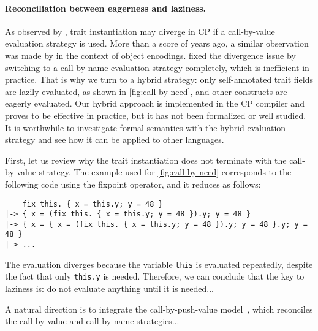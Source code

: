 \paragraph{Reconciliation between eagerness and laziness.}
As observed by \citet{fan2022direct}, trait instantiation may diverge in CP if a
call-by-value evaluation strategy is used. More than a score of years ago, a
similar observation was made by \citet{bruce1999comparing} in the context of
object encodings. \citeauthor{fan2022direct} fixed the divergence issue by
switching to a call-by-name evaluation strategy completely, which is inefficient
in practice. That is why we turn to a hybrid strategy: only self-annotated trait
fields are lazily evaluated, as shown in \autoref{fig:call-by-need}, and other
constructs are eagerly evaluated. Our hybrid approach is implemented in the CP
compiler and proves to be effective in practice, but it has not been formalized
or well studied. It is worthwhile to investigate formal semantics with the
hybrid evaluation strategy and see how it can be applied to other languages.

First, let us review why the trait instantiation does not terminate with the
call-by-value strategy. The example used for \autoref{fig:call-by-need}
corresponds to the following code using the fixpoint operator, and it reduces as
follows:
\begin{lstlisting}
    fix this. { x = this.y; y = 48 }
|-> { x = (fix this. { x = this.y; y = 48 }).y; y = 48 }
|-> { x = { x = (fix this. { x = this.y; y = 48 }).y; y = 48 }.y; y = 48 }
|-> ...
\end{lstlisting}
The evaluation diverges because the variable \lstinline{this} is evaluated
repeatedly, despite the fact that only \lstinline{this.y} is needed. Therefore,
we can conclude that the key to laziness is: do not evaluate anything until it
is needed...

A natural direction is to integrate the call-by-push-value
model~\citep{levy2012call}, which reconciles the call-by-value and call-by-name
strategies...

